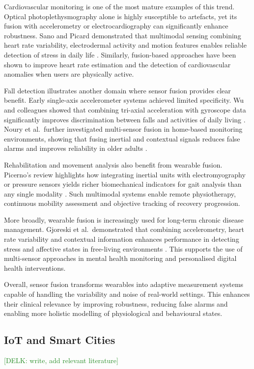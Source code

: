 \documentclass[journal]{IEEEtran}
\newcommand{\KD}[1]{\textcolor{ForestGreen}{{#1}}}
\begin{document}
Cardiovascular monitoring is one of the most mature examples of this trend. Optical photoplethysmography alone is highly susceptible to artefacts, yet its fusion with accelerometry or electrocardiography can significantly enhance robustness. Sano and Picard demonstrated that multimodal sensing combining heart rate variability, electrodermal activity and motion features enables reliable detection of stress in daily life \cite{sano_stress_2013}. Similarly, fusion-based approaches have been shown to improve heart rate estimation and the detection of cardiovascular anomalies when users are physically active.

Fall detection illustrates another domain where sensor fusion provides clear benefit. Early single-axis accelerometer systems achieved limited specificity. Wu and colleagues showed that combining tri-axial acceleration with gyroscope data significantly improves discrimination between falls and activities of daily living \cite{wu_fall_2015}. Noury et al.\ further investigated multi-sensor fusion in home-based monitoring environments, showing that fusing inertial and contextual signals reduces false alarms and improves reliability in older adults \cite{noury_fall_2008}.

Rehabilitation and movement analysis also benefit from wearable fusion. Picerno's review highlights how integrating inertial units with electromyography or pressure sensors yields richer biomechanical indicators for gait analysis than any single modality \cite{picerno_wearable_2017}. Such multimodal systems enable remote physiotherapy, continuous mobility assessment and objective tracking of recovery progression.

More broadly, wearable fusion is increasingly used for long-term chronic disease management. Gjoreski et al.\ demonstrated that combining accelerometry, heart rate variability and contextual information enhances performance in detecting stress and affective states in free-living environments \cite{gjoreski_stress_2016}. This supports the use of multi-sensor approaches in mental health monitoring and personalised digital health interventions.

Overall, sensor fusion transforms wearables into adaptive measurement systems capable of handling the variability and noise of real-world settings. This enhances their clinical relevance by improving robustness, reducing false alarms and enabling more holistic modelling of physiological and behavioural states.

\subsection{IoT and Smart Cities} \KD{[DELK: write, add relevant literature]}
\end{document}
